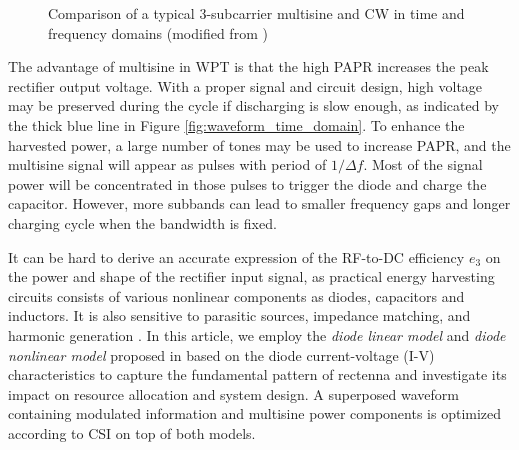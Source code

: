 %
%

\begin{figure}
  \centering
  \label{fig:waveform_frequency_domain}
  \label{fig:waveform_time_domain}
  \caption{Comparison of a typical 3-subcarrier multisine and CW in time and frequency domains (modified from \cite{Trotter2009})}
  \label{fig:waveform_comparison}
\end{figure}

The advantage of multisine in WPT is that the high PAPR increases the peak rectifier output voltage. With a proper signal and circuit design, high voltage may be preserved during the cycle if discharging is slow enough, as indicated by the thick blue line in Figure \ref{fig:waveform_time_domain}. To enhance the harvested power, a large number of tones may be used to increase PAPR, and the multisine signal will appear as pulses with period of $1/\Delta f$. Most of the signal power will be concentrated in those pulses to trigger the diode and charge the capacitor. However, more subbands can lead to smaller frequency gaps and longer charging cycle when the bandwidth is fixed.

It can be hard to derive an accurate expression of the RF-to-DC efficiency ${e_3}$ on the power and shape of the rectifier input signal, as practical energy harvesting circuits consists of various nonlinear components as diodes, capacitors and inductors. It is also sensitive to parasitic sources, impedance matching, and harmonic generation \cite{Strassner2013, Valenta2014}. In this article, we employ the \textit{diode linear model} and \textit{diode nonlinear model} proposed in \cite{Clerckx2016} based on the diode current-voltage (I-V) characteristics to capture the fundamental pattern of rectenna and investigate its impact on resource allocation and system design. A superposed waveform containing modulated information and multisine power components is optimized according to CSI on top of both models.



